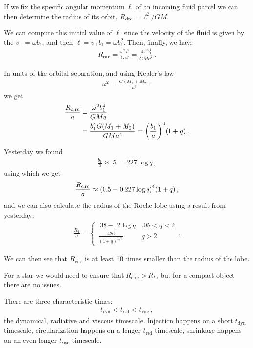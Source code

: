 \documentclass[main.tex]{subfiles}
\begin{document}
If we fix the specific angular momentum \(\ell\) of an incoming fluid parcel we can then determine the radius of its orbit, \(R _{\text{circ}} = \ell^2 / GM\). 

We can compute this initial value of \(\ell\) since the velocity of the fluid is given by the \(v_{\perp} = \omega b_1 \), and then \(\ell = v_\perp b_1 = \omega b_1^2\). 
Then, finally, we have 
%
\begin{align}
R _{\text{circ}} = \frac{\omega^2 b_1^{4}}{GM} = \frac{4 \pi^2 b_1^{4}}{GM P^2}
\,.
\end{align}

In units of the orbital separation, and using Kepler's law 
%
\begin{align}
\omega^2 = \frac{G (M_1 + M_2 )}{a^3}
\,
\end{align}
%
we get
%
\begin{align}
\frac{R _{\text{circ}}}{a} &= \frac{\omega^2 b_1^{4}}{GM a}  \\
&= \frac{b_1^{4} G (M_1 + M_2 )}{GM a^{4}} = \qty(\frac{b_1 }{a})^{4} (1 + q)
\,.
\end{align}

Yesterday we found 
%
\begin{align}
\frac{b_1 }{a} \approx \num{.5} - \num{.227} \log q
\,,
\end{align}
%
using which we get 
%
\begin{align}
\frac{R _{\text{circ}}}{a} \approx \qty(\num{.5} - \num{.227} \log q)^{4} (1+q)
\,,
\end{align}
%
and we can also calculate the radius of the Roche lobe using a result from yesterday: 
%
\begin{align}
\frac{R_1}{a} = \begin{cases}
    \num{.38} -\num{.2} \log q & \num{.05} < q < 2 \\
    \frac{\num{.426}}{(1 + q)^{1/3}} & q > 2
\end{cases}
\,.
\end{align}

We can then see that \(R _{\text{circ}}\) is at least 10 times smaller than the radius of the lobe.

For a star we would need to ensure that \(R _{\text{circ}} > R_{*}\), but for a compact object there are no issues.

There are three characteristic times: 
%
\begin{align}
t _{\text{dyn}} < t _{\text{rad}} < t _{\text{visc}}
\,,
\end{align}
%
the dynamical, radiative and viscous timescale. Injection happens on a short \(t _{\text{dyn}}\) timescale, circularization happens on a longer \(t _{\text{rad}}\) timescale, shrinkage happens on an even longer \(t _{\text{visc}}\) timescale.
\end{document}
